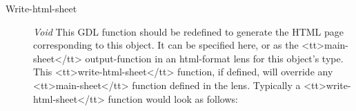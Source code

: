 \documentclass [11pt]{book}
\begin{document}
\begin{itemize}
\begin{description}

\item [Write-html-sheet]
\emph{Void} This GDL function should be redefined to generate the HTML page corresponding to this object.
It can be specified here, or as the <tt>main-sheet</tt> output-function in an html-format lens for this
object's type. This <tt>write-html-sheet</tt> function, if defined,  will override any <tt>main-sheet</tt>
function defined in the lens. Typically a <tt>write-html-sheet</tt> function would look as follows:


\end{description}







\end{itemize}





\backmatter



\printindex
\end{document}
